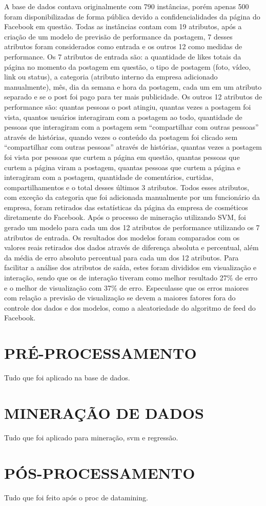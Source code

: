 A base de dados contava originalmente com 790 instâncias, porém apenas 500 foram disponibilizadas de forma pública devido a confidencialidades da página do Facebook em questão. Todas as instâncias contam com 19 atributos, após a criação de um modelo de previsão de performance da postagem, 7 desses atributos foram considerados como entrada e os outros 12 como medidas de performance.
Os 7 atributos de entrada são: a quantidade de likes totais da página no momento da postagem em questão, o tipo de postagem (foto, vídeo, link ou status), a categoria (atributo interno da empresa adicionado manualmente), mês, dia da semana e hora da postagem, cada um em um atributo separado e se o post foi pago para ter mais publicidade. Os outros 12 atributos de performance são: quantas pessoas o post atingiu, quantas vezes a postagem foi vista, quantos usuários interagiram com a postagem ao todo, quantidade de pessoas que interagiram com a postagem sem “compartilhar com outras pessoas” através de histórias, quando vezes o conteúdo da postagem foi clicado sem “compartilhar com outras pessoas” através de histórias, quantas vezes a postagem foi vista por pessoas que curtem a página em questão, quantas pessoas que curtem a página viram a postagem, quantas pessoas que curtem a página e interagiram com a postagem, quantidade de comentários, curtidas, compartilhamentos e o total desses últimos 3 atributos. Todos esses atributos, com exceção da categoria que foi adicionada manualmente por um funcionário da empresa, foram retirados das estatísticas da página da empresa de cosméticos diretamente do Facebook.
Após o processo de mineração utilizando SVM, foi gerado um modelo para cada um dos 12 atributos de performance utilizando os 7 atributos de entrada. Os resultados dos modelos foram comparados com os valores reais retirados dos dados através de diferença absoluta e percentual, além da média de erro absoluto percentual para cada um dos 12 atributos. Para facilitar a análise dos atributos de saída, estes foram divididos em visualização e interação, sendo que os de interação tiveram como melhor resultado 27\% de erro e o melhor de visualização com 37\% de erro. Especulasse que os erros maiores com relação a previsão de visualização se devem a maiores fatores fora do controle dos dados e dos modelos, como a aleatoriedade do algoritmo de feed do Facebook.


\section{PRÉ-PROCESSAMENTO}
\label{sec:metodologiaPreProc}
Tudo que foi aplicado na base de dados.

\section{MINERAÇÃO DE DADOS}
\label{sec:metodologiaMine}
Tudo que foi aplicado para mineração, svm e regressão.

\section{PÓS-PROCESSAMENTO}
\label{sec:metodologiaPosProc}
Tudo que foi feito após o proc de datamining.